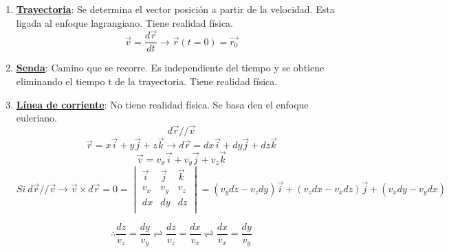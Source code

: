 \begin{enumerate}
	\item \underline{\textbf{Trayectoria}}: Se determina el vector posición a partir de la velocidad. Esta ligada al enfoque lagrangiano. Tiene realidad física.
	\[\vec{v}=\dfrac{d\vec{r}}{dt} \rightarrow \vec{r}(t=0)=\vec{r_0}\]
	
	\item \underline{\textbf{Senda}}: Camino que se recorre. Es independiente del tiempo y se obtiene eliminando el tiempo t de la trayectoria. Tiene realidad física.
	
	\item \underline{\textbf{Línea de corriente}}: No tiene realidad física. Se basa den el enfoque euleriano.
	\[d\vec{r}//\vec{v}\]
	\[\vec{r}=x\vec{i}+y\vec{j}+z\vec k \rightarrow d\vec{r}=dx\vec{i}+dy\vec{j}+dz\vec{k}\]
	\[\vec{v}=v_x\vec{i}+v_y\vec{j}+v_z\vec{k}\]
	\[Si \ d\vec{r} // \vec{v} \rightarrow \vec{v} \times d\vec{r}=0= \begin{vmatrix}
		\vec i & \vec j & \vec k \\
		v_x & v_y & v_z \\
		dx & dy & dz \\
	\end{vmatrix}= \left(v_ydz-v_zdy\right)\vec{i} +\left(v_zdx-v_xdz\right)\vec{j}+\left(v_xdy-v_ydx\right) \]
	
	\[\therefore\dfrac{dz}{v_z}=\dfrac{dy}{v_y} \rightleftharpoons \dfrac{dz}{v_z}=\dfrac{dx}{v_x} \rightleftharpoons \dfrac{dx}{v_x}=\dfrac{dy}{v_y} \]
\end{enumerate}

